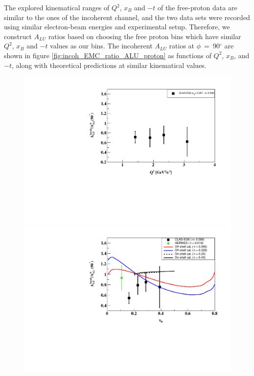 The explored kinematical ranges of $Q^2$, $x_{B}$ and $-t$ of the free-proton 
data are similar to the ones of the incoherent channel, and the two data sets 
were recorded using similar electron-beam energies and experimental setup.  
Therefore, we construct $A_{LU}$ ratios based on choosing the free proton bins 
which have similar $Q^2$, $x_{B}$ and $-t$ values as our bins. The incoherent 
$A_{LU}$ ratios at $\phi$~=~90$^{\circ}$ are shown in figure 
\ref{fig:incoh_EMC_ratio_ALU_proton} as functions of $Q^{2}$, $x_{B}$, and 
$-t$, along with theoretical predictions at similar kinematical values.
  
\begin{figure}[tp]
\centering
\includegraphics[scale=0.52]{fig_Dec2016/ALU_ratioInc_Q2_shortscenrario.pdf}\\
\includegraphics[scale=0.52]{fig_Dec2016/ALU_ratioInc_x_shortscenrario.pdf}\\

\end{figure}
